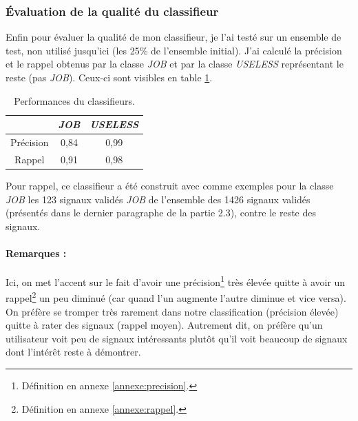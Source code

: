             \subsubsection{Évaluation de la qualité du classifieur}
                Enfin pour évaluer la qualité de mon classifieur, je l'ai testé sur un ensemble de test, non utilisé jusqu'ici (les 25\% de l'ensemble initial). J'ai calculé la précision et le rappel obtenus par la classe \textit{JOB} et par la classe \textit{USELESS} représentant le reste (pas \textit{JOB}). Ceux-ci sont visibles en table \ref{tab:classif_perf}.
                \begin{table}[h]
                    \centering
                    \begin{tabular}{| c | c | c |}
                        \hline
                         & \textit{JOB} & \textit{USELESS} \\
                        \hline
                        Précision & 0,84 & 0,99 \\
                        Rappel & 0,91 & 0,98 \\
                        \hline
                    \end{tabular}
                    \caption{Performances du classifieurs.}
                    \label{tab:classif_perf}
                \end{table}
                Pour rappel, ce classifieur a été construit avec comme exemples pour la classe \textit{JOB} les 123 signaux validés \textit{JOB} de l’ensemble des 1426 signaux validés (présentés dans le dernier paragraphe de la partie 2.3), contre le reste des signaux.

            \paragraph{Remarques :}
                Ici, on met l'accent sur le fait d'avoir une précision\footnote{Définition en annexe \ref{annexe:precision}.} très élevée quitte à avoir un rappel\footnote{Définition en annexe \ref{annexe:rappel}.} un peu diminué (car quand l'un augmente l'autre diminue et vice versa). On préfère se tromper très rarement dans notre classification (précision élevée) quitte à rater des signaux (rappel moyen). Autrement dit, on préfère qu'un utilisateur voit peu de signaux intéressants plutôt qu'il voit beaucoup de signaux dont l'intérêt reste à démontrer.

